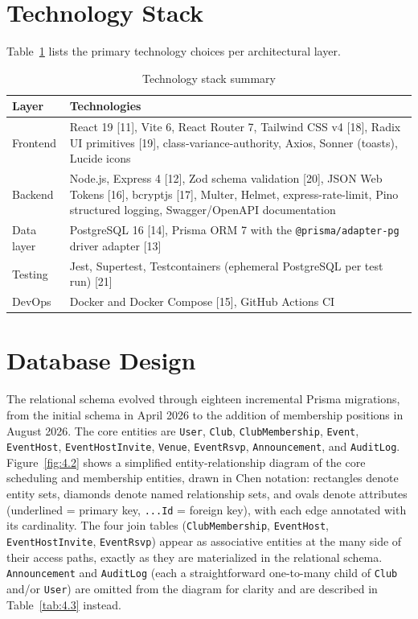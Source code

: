 \documentclass[12pt,oneside]{book}
\begin{document}
\section{Technology Stack}

Table~\ref{tab:4.2} lists the primary technology choices per architectural layer.

\begin{table}[H]
\caption{Technology stack summary}
\label{tab:4.2}
\centering
\small
\begin{tabularx}{\textwidth}{@{}p{2.6cm}X@{}}
\toprule
Layer & Technologies \\
\midrule
Frontend & React 19 [11], Vite 6, React Router 7, Tailwind CSS v4 [18], Radix UI primitives [19], class-variance-authority, Axios, Sonner (toasts), Lucide icons \\
Backend & Node.js, Express 4 [12], Zod schema validation [20], JSON Web Tokens [16], bcryptjs [17], Multer, Helmet, express-rate-limit, Pino structured logging, Swagger/OpenAPI documentation \\
Data layer & PostgreSQL 16 [14], Prisma ORM 7 with the \texttt{@prisma/adapter-pg} driver adapter [13] \\
Testing & Jest, Supertest, Testcontainers (ephemeral PostgreSQL per test run) [21] \\
DevOps & Docker and Docker Compose [15], GitHub Actions CI \\
\bottomrule
\end{tabularx}
\end{table}

\section{Database Design}

The relational schema evolved through eighteen incremental Prisma migrations, from the initial schema in April 2026 to the addition of membership positions in August 2026. The core entities are \texttt{User}, \texttt{Club}, \texttt{ClubMembership}, \texttt{Event}, \texttt{EventHost}, \texttt{EventHostInvite}, \texttt{Venue}, \texttt{EventRsvp}, \texttt{Announcement}, and \texttt{AuditLog}. Figure~\ref{fig:4.2} shows a simplified entity-relationship diagram of the core scheduling and membership entities, drawn in Chen notation: rectangles denote entity sets, diamonds denote named relationship sets, and ovals denote attributes (underlined = primary key, \texttt{...Id} = foreign key), with each edge annotated with its cardinality. The four join tables (\texttt{ClubMembership}, \texttt{EventHost}, \texttt{EventHostInvite}, \texttt{EventRsvp}) appear as associative entities at the many side of their access paths, exactly as they are materialized in the relational schema. \texttt{Announcement} and \texttt{AuditLog} (each a straightforward one-to-many child of \texttt{Club} and/or \texttt{User}) are omitted from the diagram for clarity and are described in Table~\ref{tab:4.3} instead.
\end{document}
